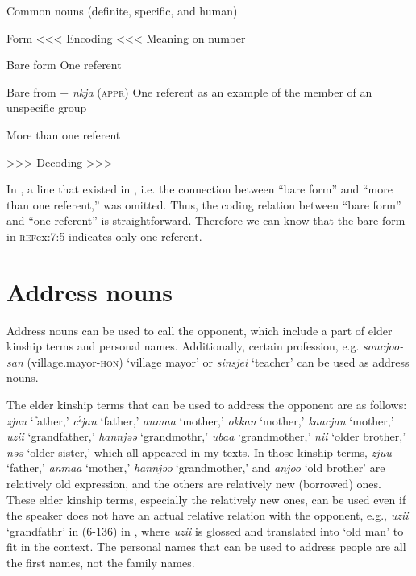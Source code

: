 \begin{styleBeschriftung}
\textmd{}\textmd{ Common nouns (definite, specific, and human)}
\end{styleBeschriftung}

Form  <<< Encoding <<<  Meaning on number

Bare form  %
\ea \label{ex:7:a}One referent

Bare from + \textit{nkja} (\textsc{appr})  %
\ex \label{ex:7:b}One referent as an example of the member of an unspecific group

  \ex \label{ex:7:c}More than one referent

  >>> Decoding >>>  
  \z
\z

In , a line that existed in , i.e. the connection between “bare form” and “more than one referent,” was omitted. Thus, the coding relation between “bare form” and “one referent” is straightforward. Therefore we can know that the bare form in \textsc{ref}{ex:7:5} indicates only one referent.

\section{Address nouns}

Address nouns can be used to call the opponent, which include a part of elder kinship terms and personal names. Additionally, certain profession, e.g. \textit{soncjoo-san} (village.mayor-\textsc{hon}) ‘village mayor’ or \textit{sinsjei} ‘teacher’ can be used as address nouns.

The elder kinship terms that can be used to address the opponent are as follows: \textit{zjuu} ‘father,’ \textit{cˀjan} ‘father,’ \textit{anmaa} ‘mother,’ \textit{okkan} ‘mother,’ \textit{kaacjan} ‘mother,’ \textit{uzii} ‘grandfather,’ \textit{hannjəə} ‘grandmothr,’ \textit{ubaa} ‘grandmother,’ \textit{nii} ‘older brother,’ \textit{nəə} ‘older sister,’ which all appeared in my texts. In those kinship terms, \textit{zjuu} ‘father,’ \textit{anmaa} ‘mother,’ \textit{hannjəə} ‘grandmother,’ and \textit{anjoo} ‘old brother’ are relatively old expression, and the others are relatively new (borrowed) ones. These elder kinship terms, especially the relatively new ones, can be used even if the speaker does not have an actual relative relation with the opponent, e.g., \textit{uzii} ‘grandfathr’ in (6-136) in , where \textit{uzii} is glossed and translated into ‘old man’ to fit in the context. The personal names that can be used to address people are all the first names, not the family names.


